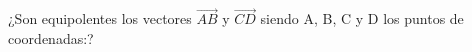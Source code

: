 \documentclass[addpoints,spanish, 12pt,a4paper]{exam}
\begin{document}
        \begin{questions}
        
        
        \question ¿Son equipolentes los vectores  $\overrightarrow {AB} $  y  $\overrightarrow {CD} $ siendo A, B, C y D los puntos de coordenadas:?
\end{questions}
\end{document}
